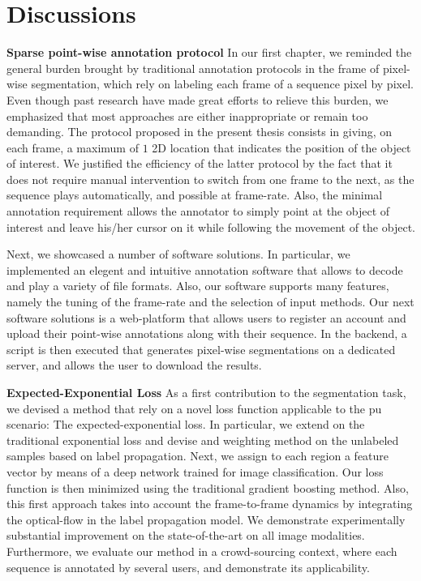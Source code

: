 \section{Discussions}

\textbf{Sparse point-wise annotation protocol}
In our first chapter, we reminded the general burden brought by traditional annotation protocols in the frame of pixel-wise segmentation, which rely on labeling each frame of a sequence pixel by pixel.
Even though past research have made great efforts to relieve this burden, we emphasized that most approaches are either inappropriate or remain too demanding.
The protocol proposed in the present thesis consists in giving, on each frame, a maximum of $1$ 2D location that indicates the position of the object of interest.
We justified the efficiency of the latter protocol by the fact that it does not require manual intervention to switch from one frame to the next, as the sequence plays automatically, and possible at frame-rate.
Also, the minimal annotation requirement allows the annotator to simply point at the object of interest and leave his/her cursor on it while following the movement of the object.

Next, we showcased a number of software solutions.
In particular, we implemented an elegent and intuitive annotation software that allows to decode and play a variety of file formats.
Also, our software supports many features, namely the tuning of the frame-rate and the selection of input methods.
Our next software solutions is a web-platform that allows users to register an account and upload their point-wise annotations along with their sequence.
In the backend, a script is then executed that generates pixel-wise segmentations on a dedicated server, and allows the user to download the results.

\textbf{Expected-Exponential Loss}
As a first contribution to the segmentation task, we devised a method that rely on a novel loss function applicable to the \gls{pu} scenario: The expected-exponential loss.
In particular, we extend on the traditional exponential loss and devise and weighting method on the unlabeled samples based on label propagation.
Next, we assign to each region a feature vector by means of a deep network trained for image classification.
Our loss function is then minimized using the traditional gradient boosting method.
Also, this first approach takes into account the frame-to-frame dynamics by integrating the optical-flow in the label propagation model.
We demonstrate experimentally substantial improvement on the state-of-the-art on all image modalities.
Furthermore, we evaluate our method in a crowd-sourcing context, where each sequence is annotated by several users, and demonstrate its applicability.


